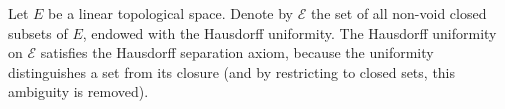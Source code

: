 Let $E$ be a linear topological space. Denote by $\mathcal{E}$ the set of all non-void closed subsets of $E$, endowed with the Hausdorff uniformity. The Hausdorff uniformity on $\mathcal{E}$ satisfies the Hausdorff separation axiom, because the uniformity distinguishes a set from its closure (and by restricting to closed sets, this ambiguity is removed).
